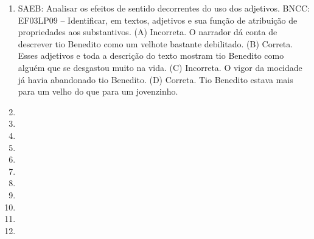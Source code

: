 \begin{enumerate}
\item
SAEB: Analisar os efeitos de sentido decorrentes do uso dos adjetivos.
BNCC: EF03LP09 -- Identificar, em textos, adjetivos e sua função de atribuição de propriedades
aos substantivos.
(A) Incorreta. O narrador dá conta de descrever tio Benedito como um velhote bastante debilitado.
(B) Correta. Esses adjetivos e toda a descrição do texto mostram tio Benedito como alguém que se desgastou muito na vida.
(C) Incorreta. O vigor da mocidade já havia abandonado tio Benedito.
(D) Correta. Tio Benedito estava mais para um velho do que para um jovenzinho.

\item
\item
\item
\item
\item
\item
\item
\item
\item
\item
\item
\end{enumerate}


